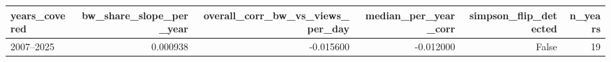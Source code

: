 \begin{tabular}{lrrrrr}
\toprule
years_covered & bw_share_slope_per_year & overall_corr_bw_vs_views_per_day & median_per_year_corr & simpson_flip_detected & n_years \\
\midrule
2007–2025 & 0.000938 & -0.015600 & -0.012000 & False & 19 \\
\bottomrule
\end{tabular}
